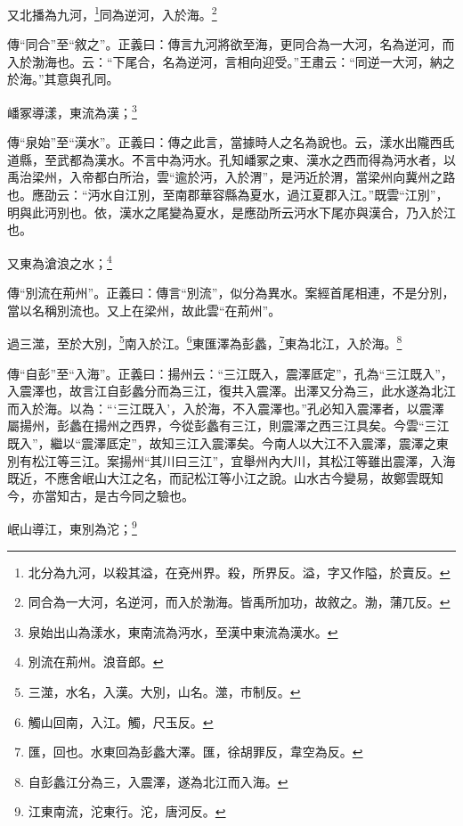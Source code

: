 又北播為九河，\footnote{北分為九河，以殺其溢，在兗州界。殺，所界反。溢，字又作隘，於賣反。}同為逆河，入於海。\footnote{同合為一大河，名逆河，而入於渤海。皆禹所加功，故敘之。渤，蒲兀反。}

{\noindent\zhuan{}\fzbyks 傳“同合”至“敘之”。正義曰：傳言九河將欲至海，更同合為一大河，名為逆河，而入於渤海也。云：“下尾合，名為逆河，言相向迎受。”王肅云：“同逆一大河，納之於海。”其意與孔同。 \par}

嶓冢導漾，東流為漢；\footnote{泉始出山為漾水，東南流為沔水，至漢中東流為漢水。}

{\noindent\zhuan{}\fzbyks 傳“泉始”至“漢水”。正義曰：傳之此言，當據時人之名為說也。云，漾水出隴西氐道縣，至武都為漢水。不言中為沔水。孔知嶓冢之東、漢水之西而得為沔水者，以禹治梁州，入帝都白所治，雲“逾於沔，入於渭”，是沔近於渭，當梁州向冀州之路也。應劭云：“沔水自江別，至南郡華容縣為夏水，過江夏郡入江。”既雲“江別”，明與此沔別也。依，漢水之尾變為夏水，是應劭所云沔水下尾亦與漢合，乃入於江也。 \par}

又東為滄浪之水；\footnote{別流在荊州。浪音郎。}

{\noindent\zhuan{}\fzbyks 傳“別流在荊州”。正義曰：傳言“別流”，似分為異水。案經首尾相連，不是分別，當以名稱別流也。又上在梁州，故此雲“在荊州”。 \par}

過三澨，至於大別，\footnote{三澨，水名，入漢。大別，山名。澨，市制反。}南入於江。\footnote{觸山回南，入江。觸，尺玉反。}東匯澤為彭蠡，\footnote{匯，回也。水東回為彭蠡大澤。匯，徐胡罪反，韋空為反。}東為北江，入於海。\footnote{自彭蠡江分為三，入震澤，遂為北江而入海。}

{\noindent\zhuan{}\fzbyks 傳“自彭”至“入海”。正義曰：揚州云：“三江既入，震澤厎定”，孔為“三江既入”，入震澤也，故言江自彭蠡分而為三江，復共入震澤。出澤又分為三，此水遂為北江而入於海。以為：“‘三江既入’，入於海，不入震澤也。”孔必知入震澤者，以震澤屬揚州，彭蠡在揚州之西界，今從彭蠡有三江，則震澤之西三江具矣。今雲“三江既入”，繼以“震澤厎定”，故知三江入震澤矣。今南人以大江不入震澤，震澤之東別有松江等三江。案揚州“其川曰三江”，宜舉州內大川，其松江等雖出震澤，入海既近，不應舍岷山大江之名，而記松江等小江之說。山水古今變易，故鄭雲既知今，亦當知古，是古今同之驗也。 \par}

岷山導江，東別為沱；\footnote{江東南流，沱東行。沱，唐河反。}

